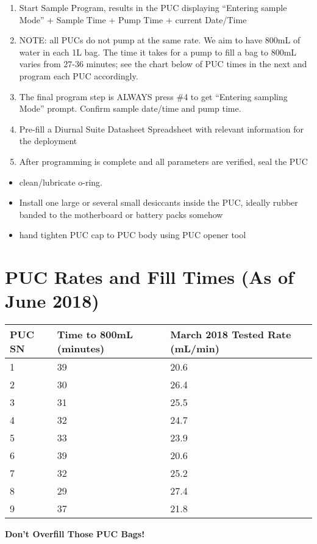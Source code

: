 \documentclass[]{book}
\providecommand{\tightlist}{%
  \setlength{\itemsep}{0pt}\setlength{\parskip}{0pt}}
\begin{document}
\begin{enumerate}
\def\labelenumi{\arabic{enumi}.}
\setcounter{enumi}{6}
\item
  Start Sample Program, results in the PUC displaying ``Entering sample
  Mode'' + Sample Time + Pump Time + current Date/Time
\item
  NOTE: all PUCs do not pump at the same rate. We aim to have 800mL of
  water in each 1L bag. The time it takes for a pump to fill a bag to
  800mL varies from 27-36 minutes; see the chart below of PUC times in
  the next and program each PUC accordingly.
\item
  The final program step is ALWAYS press \#4 to get ``Entering sampling
  Mode'' prompt. Confirm sample date/time and pump time.
\item
  Pre-fill a Diurnal Suite Datasheet Spreadsheet with relevant
  information for the deployment
\item
  After programming is complete and all parameters are verified, seal
  the PUC
\end{enumerate}

\begin{itemize}
\tightlist
\item
  clean/lubricate o-ring.
\item
  Install one large or several small desiccants inside the PUC, ideally
  rubber banded to the motherboard or battery packs somehow
\item
  hand tighten PUC cap to PUC body using PUC opener tool
\end{itemize}

\section{PUC Rates and Fill Times (As of June
2018)}\label{puc-rates-and-fill-times-as-of-june-2018}

\begin{longtable}[]{@{}lll@{}}
\toprule
\textbf{PUC SN} & \textbf{Time to 800mL (minutes)} & \textbf{March 2018
Tested Rate (mL/min)}\tabularnewline
\midrule
\endhead
1 & 39 & 20.6\tabularnewline
2 & 30 & 26.4\tabularnewline
3 & 31 & 25.5\tabularnewline
4 & 32 & 24.7\tabularnewline
5 & 33 & 23.9\tabularnewline
6 & 39 & 20.6\tabularnewline
7 & 32 & 25.2\tabularnewline
8 & 29 & 27.4\tabularnewline
9 & 37 & 21.8\tabularnewline
\bottomrule
\end{longtable}

\textbf{Don't Overfill Those PUC Bags!}
\end{document}
